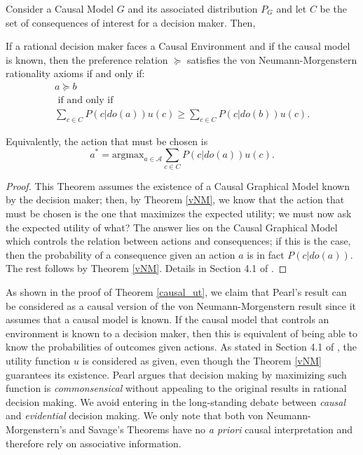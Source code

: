 \documentclass{svjour3}                     %
\begin{document}
Consider a Causal Model $G$ and its associated distribution $P_G$ and let $C$ be the set of consequences of interest for a decision maker. Then,
\begin{theorem}{\label{causal_ut}}
If a rational decision maker faces a Causal Environment and if the causal model is known, then the preference relation $\succeq$ satisfies the von Neumann-Morgenstern rationality axioms if and only if:
\begin{eqnarray*}
&a \succeq b&\\
& \textrm{ if and only if }&\\
 &\sum_{c \in C} P(c | do(a))u(c) \geq \sum_{c \in C} P(c | do(b))u(c).&
\end{eqnarray*} 
\end{theorem}
Equivalently, the action that must be chosen is 
\begin{equation}
a^\ast = \textrm{argmax}_{a \in \mathcal{A}} \sum_{c \in C} P(c | do(a))u(c).
\end{equation}
\begin{proof}
This Theorem assumes the existence of a Causal Graphical Model known by the decision maker; then, by Theorem \ref{vNM}, we know that the action that must be chosen is the one that maximizes the expected utility; we must now ask the expected utility of what? The answer lies on the Causal Graphical Model which controls the relation between actions and consequences; if this is the case, then the probability of a consequence given an action $a$ is in fact $P(c|do(a))$. The rest follows by Theorem \ref{vNM}. Details in Section 4.1 of \cite{pearl2009causality}.
\end{proof}

As shown in the proof of Theorem \ref{causal_ut}, we claim that Pearl's result can be considered as a causal version of the von Neumann-Morgenstern result since it assumes that a causal model is known. If the causal model that controls an environment is known to a decision maker, then this is equivalent of being able to know the probabilities of outcomes given actions. As stated in Section 4.1 of \cite{pearl2009causality}, the utility function $u$ is considered as given, even though the Theorem \ref{vNM} guarantees its existence. Pearl argues that decision making by maximizing such function is \textit{commonsensical} without appealing to the original results in rational decision making. We avoid entering in the long-standing debate between \textit{causal} and \textit{evidential} decision making. We only note that both von Neumann-Morgenstern's and Savage's Theorems have no {\em a priori} causal interpretation and therefore rely on associative information.
\end{document}
